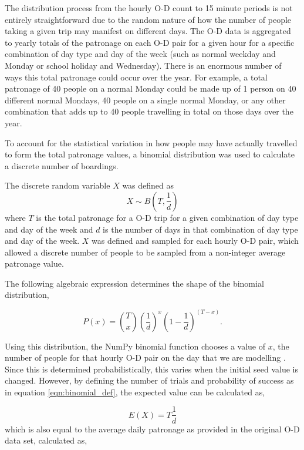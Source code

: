 The distribution process from the hourly O-D count to 15 minute periods is not entirely straightforward due to the random nature of how the number of people taking a given trip may manifest on different days. The O-D data is aggregated to yearly totals of the patronage on each O-D pair for a given hour for a specific combination of day type and day of the week (such as normal weekday and Monday or school holiday and Wednesday). There is an enormous number of ways this total patronage could occur over the year. For example, a total patronage of 40 people on a normal Monday could be made up of 1 person on 40 different normal Mondays, 40 people on a single normal Monday, or any other combination that adds up to 40 people travelling in total on those days over the year. 

To account for the statistical variation in how people may have actually travelled to form the total patronage values, a binomial distribution was used to calculate a discrete number of boardings. 

The discrete random variable $X$ was defined as 
\begin{equation}
    X \sim B(T, \frac{1}{d})
    \label{eqn:binomial_def}
\end{equation}
where $T$ is the total patronage for a O-D trip for a given combination of day type and day of the week and $d$ is the number of days in that combination of day type and day of the week. $X$ was defined and sampled for each hourly O-D pair, which allowed a discrete number of people to be sampled from a non-integer average patronage value. 

The following algebraic expression determines the shape of the binomial distribution,

\begin{equation}
    P(x) =  \binom{T}{x} \left( \frac{1}{d} \right)^x  \left( 1-\frac{1}{d} \right)^{\left( {T-x} \right)}.
    \label{eqn:binomial_eqn}
\end{equation}

Using this distribution, the NumPy binomial function chooses a value of $x$, the number of people for that hourly O-D pair on the day that we are modelling \cite{harrisArrayProgrammingNumPy2020}. Since this is determined probabilistically, this varies when the initial seed value is changed. However, by defining the number of trials and probability of success as in equation \ref{eqn:binomial_def}, the expected value can be calculated as,

\begin{equation}
    E(X) = T \frac{1}{d}
    \label{eqn:binomial_expectedvalue}
\end{equation}
which is also equal to the average daily patronage as provided in the original O-D data set, calculated as, 


